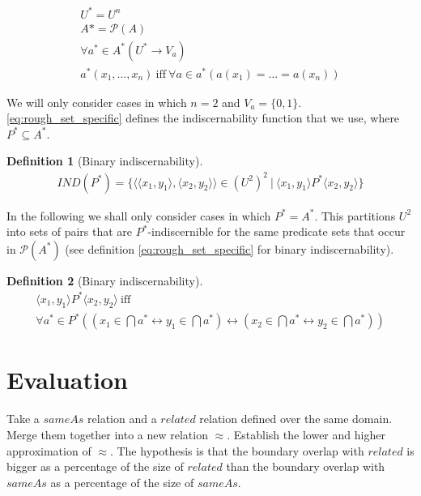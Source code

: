\documentclass[11pt,a4paper,notitlepage,onecolumn,twoside]{article}
\newtheorem{definition}{Definition}
\begin{document}
\begin{align}
\label{eq:rough_set_generic}
U^* = U^n \\
A* = \mathcal{P}(A) \\
\forall a^* \in A^* (U^* \rightarrow V_a) \\
a^*(x_1, \ldots, x_n) \  \text{iff} \  \forall a \in a^* (a(x_1) = \ldots = a(x_n))
\end{align}

We will only consider cases in which $n = 2$ and $V_a = \{ 0, 1 \}$. \ref{eq:rough_set_specific} defines the indiscernability function that we use, where $P^* \subseteq A^*$.

\begin{definition}[Binary indiscernability]
\begin{align}
\label{eq:rough_set_specific}
IND(P^*) = \{
  \langle
    \langle x_1, y_1 \rangle,
    \langle x_2, y_2 \rangle
  \rangle \in (U^2)^2
\  \vert \ 
  \langle x_1, y_1 \rangle P^* \langle x_2, y_2 \rangle
\}
\end{align}
\end{definition}

In the following we shall only consider cases in which $P^* = A^*$. This partitions $U^2$ into sets of pairs that are $P^*$-indiscernible for the same predicate sets that occur in $\mathcal{P}(A^*)$ (see definition \ref{eq:rough_set_specific} for binary indiscernability).

\begin{definition}[Binary indiscernability]
\begin{align}
\label{eq:rough_set_r}
\langle x_1, y_1 \rangle P^* \langle x_2, y_2 \rangle \  \text{iff} \  \\
  \forall a^* \in P^* (
    (x_1 \in \bigcap a^* \leftrightarrow y_1 \in \bigcap a^*)
  \leftrightarrow
    (x_2 \in \bigcap a^* \leftrightarrow y_2 \in \bigcap a^*)
  )
\end{align}
\end{definition}

\section{Evaluation}
\label{sec:evaluation}

Take a $sameAs$ relation and a $related$ relation defined over the same domain. Merge them together into a new relation $\approx$. Establish the lower and higher approximation of $\approx$. The hypothesis is that the boundary overlap with $related$ is bigger as a percentage of the size of $related$ than the boundary overlap with $sameAs$ as a percentage of the size of $sameAs$.
\end{document}
